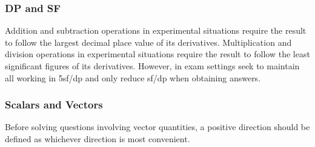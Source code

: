 \documentclass[../main]{subfiles}
\begin{document}
	\subsubsection{DP and SF}

	Addition and subtraction operations in experimental situations require the result to follow the largest decimal place value of its derivatives. Multiplication and division operations in experimental situations require the result to follow the least significant figures of its derivatives. However, in exam settings seek to maintain all working in 5sf/dp and only reduce sf/dp when obtaining answers.

	\subsubsection{Scalars and Vectors}



	Before solving questions involving vector quantities, a positive direction should be defined as whichever direction is most convenient.
\end{document}
